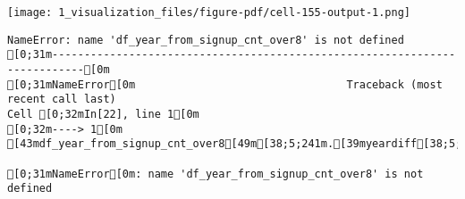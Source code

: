 \documentclass[
  letterpaper,
  DIV=11,
  numbers=noendperiod]{scrartcl}
\newenvironment{Shaded}{\begin{snugshade}}{\end{snugshade}}
\begin{document}
\texttt{[image: 1\_visualization\_files/figure-pdf/cell-155-output-1.png]}

\begin{Shaded}
\begin{Highlighting}[]

\end{Highlighting}
\end{Shaded}

\begin{verbatim}
NameError: name 'df_year_from_signup_cnt_over8' is not defined
[0;31m---------------------------------------------------------------------------[0m
[0;31mNameError[0m                                 Traceback (most recent call last)
Cell [0;32mIn[22], line 1[0m
[0;32m----> 1[0m [43mdf_year_from_signup_cnt_over8[49m[38;5;241m.[39myeardiff[38;5;241m.[39mvalues

[0;31mNameError[0m: name 'df_year_from_signup_cnt_over8' is not defined
\end{verbatim}
\end{document}
